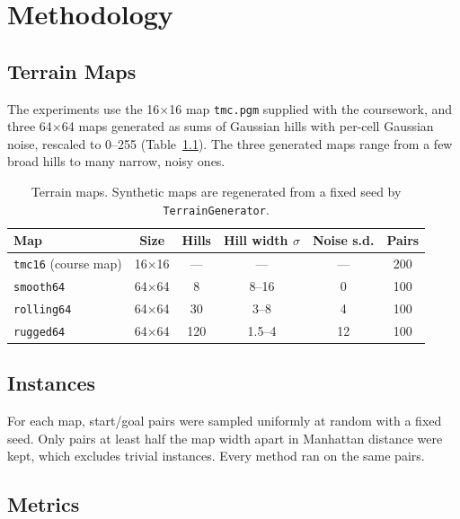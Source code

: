 \chapter{Methodology}
\label{ch:methodology}

\section{Terrain Maps}

The experiments use the 16$\times$16 map \texttt{tmc.pgm} supplied with the coursework, and three 64$\times$64 maps generated as sums of Gaussian hills with per-cell Gaussian noise, rescaled to 0--255 (Table~\ref{tab:maps}). The three generated maps range from a few broad hills to many narrow, noisy ones.

\begin{table}[ht]
\centering
\caption[Terrain maps used in the experiments]{Terrain maps. Synthetic maps are regenerated from a fixed seed by \texttt{TerrainGenerator}.}
\label{tab:maps}
\begin{tabular}{lccccc}
\toprule
Map & Size & Hills & Hill width $\sigma$ & Noise s.d. & Pairs \\
\midrule
\texttt{tmc16} (course map) & 16$\times$16 & --- & --- & --- & 200 \\
\texttt{smooth64} & 64$\times$64 & 8 & 8--16 & 0 & 100 \\
\texttt{rolling64} & 64$\times$64 & 30 & 3--8 & 4 & 100 \\
\texttt{rugged64} & 64$\times$64 & 120 & 1.5--4 & 12 & 100 \\
\bottomrule
\end{tabular}
\end{table}


\section{Instances}

For each map, start/goal pairs were sampled uniformly at random with a fixed seed. Only pairs at least half the map width apart in Manhattan distance were kept, which excludes trivial instances. Every method ran on the same pairs.


\section{Metrics}

